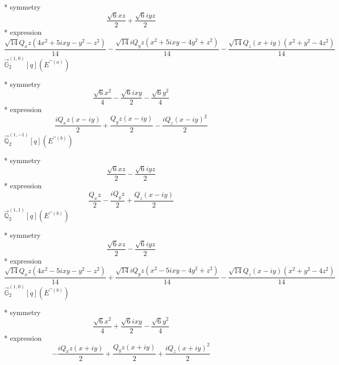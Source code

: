 \documentclass[fleqn,8pt]{jsarticle}
\begin{document}
\noindent\quad ** symmetry
\begin{dmath*}
\frac{\sqrt{6} x z}{2} + \frac{\sqrt{6} i y z}{2}
\end{dmath*}
\noindent\quad ** expression
\begin{dmath*}
\frac{\sqrt{14} Q_{x} z \left(4 x^{2} + 5 i x y - y^{2} - z^{2}\right)}{14} - \frac{\sqrt{14} i Q_{y} z \left(x^{2} + 5 i x y - 4 y^{2} + z^{2}\right)}{14} - \frac{\sqrt{14} Q_{z} \left(x + i y\right) \left(x^{2} + y^{2} - 4 z^{2}\right)}{14}
\end{dmath*}
\noindent\quad $\vec{\mathbb{G}}_{2}^{(1,0)}[q](E^{\prime\prime(a)})$

\noindent\quad ** symmetry
\begin{dmath*}
\frac{\sqrt{6} x^{2}}{4} - \frac{\sqrt{6} i x y}{2} - \frac{\sqrt{6} y^{2}}{4}
\end{dmath*}
\noindent\quad ** expression
\begin{dmath*}
\frac{i Q_{x} z \left(x - i y\right)}{2} + \frac{Q_{y} z \left(x - i y\right)}{2} - \frac{i Q_{z} \left(x - i y\right)^{2}}{2}
\end{dmath*}
\noindent\quad $\vec{\mathbb{Q}}_{2}^{(1,-1)}[q](E^{\prime\prime(b)})$

\noindent\quad ** symmetry
\begin{dmath*}
\frac{\sqrt{6} x z}{2} - \frac{\sqrt{6} i y z}{2}
\end{dmath*}
\noindent\quad ** expression
\begin{dmath*}
\frac{Q_{x} z}{2} - \frac{i Q_{y} z}{2} + \frac{Q_{z} \left(x - i y\right)}{2}
\end{dmath*}
\noindent\quad $\vec{\mathbb{Q}}_{2}^{(1,1)}[q](E^{\prime\prime(b)})$

\noindent\quad ** symmetry
\begin{dmath*}
\frac{\sqrt{6} x z}{2} - \frac{\sqrt{6} i y z}{2}
\end{dmath*}
\noindent\quad ** expression
\begin{dmath*}
\frac{\sqrt{14} Q_{x} z \left(4 x^{2} - 5 i x y - y^{2} - z^{2}\right)}{14} + \frac{\sqrt{14} i Q_{y} z \left(x^{2} - 5 i x y - 4 y^{2} + z^{2}\right)}{14} - \frac{\sqrt{14} Q_{z} \left(x - i y\right) \left(x^{2} + y^{2} - 4 z^{2}\right)}{14}
\end{dmath*}
\noindent\quad $\vec{\mathbb{G}}_{2}^{(1,0)}[q](E^{\prime\prime(b)})$

\noindent\quad ** symmetry
\begin{dmath*}
\frac{\sqrt{6} x^{2}}{4} + \frac{\sqrt{6} i x y}{2} - \frac{\sqrt{6} y^{2}}{4}
\end{dmath*}
\noindent\quad ** expression
\begin{dmath*}
- \frac{i Q_{x} z \left(x + i y\right)}{2} + \frac{Q_{y} z \left(x + i y\right)}{2} + \frac{i Q_{z} \left(x + i y\right)^{2}}{2}
\end{dmath*}
\end{document}
